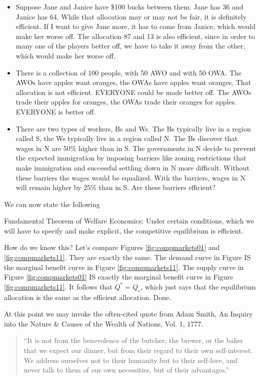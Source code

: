 \documentclass[
]{book}
\begin{document}
\begin{itemize}
\item
  Suppose Jane and Janice have \$100 bucks between them. Jane has 36 and Janice has 64. While that allocation may or may not be fair, it is definitely efficient. If I want to give Jane more, it has to come from Janice, which would make her worse off. The allocation 87 and 13 is also efficient, since in order to many one of the players better off, we have to take it away from the other, which would make her worse off.
\item
  There is a collection of 100 people, with 50 AWO and with 50 OWA. The AWOs have apples want oranges, the OWAs have apples want oranges. That allocation is not efficient. EVERYONE could be made better off. The AWOs trade their apples for oranges, the OWAs trade their oranges for apples. EVERYONE is better off.
\item
  There are two types of workers, Bs and Ws. The Bs typically live in a region called S, the Ws typically live in a region called N. The Bs discover that wages in N are 50\% higher than in S. The governments in N decide to prevent the expected immigration by imposing barriers like zoning restrictions that make immigration and successful settling down in N more difficult. Without these barriers the wages would be equalized. With the barriers, wages in N will remain higher by 25\% than in S. Are these barriers efficient?
\end{itemize}

We can now state the following

Fundamental Theorem of Welfare Economics: Under certain conditions, which we will have to specify and make explicit, the competitive equilibrium is efficient.

How do we know this? Let's compare Figures \ref{fig:compmarkets01} and \ref{fig:compmarkets11}. They are exactly the same. The demand curve in Figure IS the marginal benefit curve in Figure \ref{fig:compmarkets11}. The supply curve in Figure \ref{fig:compmarkets01} IS exactly the marginal benefit curve in Figure \ref{fig:compmarkets11}. It follows that \(Q^* = Q_e\), which just says that the equilibrium allocation is the same as the efficient allocation. Done.

At this point we may invoke the often-cited quote from Adam Smith, An Inquiry into the Nature \& Causes of the Wealth of Nations, Vol. 1, 1777.

\begin{quote}
``It is not from the benevolence of the butcher, the brewer, or the baker that we expect our dinner, but from their regard to their own self-interest. We address ourselves not to their humanity but to their self-love, and never talk to them of our own necessities, but of their advantages.''
\end{quote}
\end{document}

